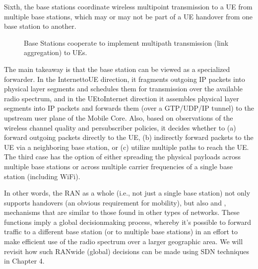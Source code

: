 \documentclass[a4paper,11pt,english]{sphinxmanual}
\let\sphinxpxdimen\pdfpxdimen\else\newdimen\sphinxpxdimen
\begin{document}
\sphinxAtStartPar
Sixth, the base stations coordinate wireless multi\sphinxhyphen{}point transmission to
a UE from multiple base stations, which may or may not be part of a UE
handover from one base station to another.

\begin{figure}[ht]
\centering
\capstart

\noindent\sphinxincludegraphics[width=500\sphinxpxdimen]{{Slide11}.png}
\caption{Base Stations cooperate to implement multipath transmission (link
aggregation) to UEs.}\label{\detokenize{arch:id12}}\label{\detokenize{arch:fig-link-aggregation}}\end{figure}

\sphinxAtStartPar
The main takeaway is that the base station can be viewed as a
specialized forwarder. In the Internet\sphinxhyphen{}to\sphinxhyphen{}UE direction, it fragments
outgoing IP packets into physical layer segments and schedules them
for transmission over the available radio spectrum, and in the
UE\sphinxhyphen{}to\sphinxhyphen{}Internet direction it assembles physical layer segments into IP
packets and forwards them (over a GTP/UDP/IP tunnel) to the upstream
user plane of the Mobile Core. Also, based on observations of the
wireless channel quality and per\sphinxhyphen{}subscriber policies, it decides
whether to (a) forward outgoing packets directly to the UE, (b)
indirectly forward packets to the UE via a neighboring base station,
or (c) utilize multiple paths to reach the UE. The third case has the
option of either spreading the physical payloads across multiple base
stations or across multiple carrier frequencies of a single base
station (including Wi\sphinxhyphen{}Fi).

\sphinxAtStartPar
In other words, the RAN as a whole (i.e., not just a single base
station) not only supports handovers (an obvious requirement for
mobility), but also  and ,
mechanisms that are similar to those found in other types of networks.
These functions imply a global decision\sphinxhyphen{}making process, whereby it’s
possible to forward traffic to a different base station (or to
multiple base stations) in an effort to make efficient use of the
radio spectrum over a larger geographic area. We will revisit how such
RAN\sphinxhyphen{}wide (global) decisions can be made using SDN techniques in
Chapter 4.
\end{document}
